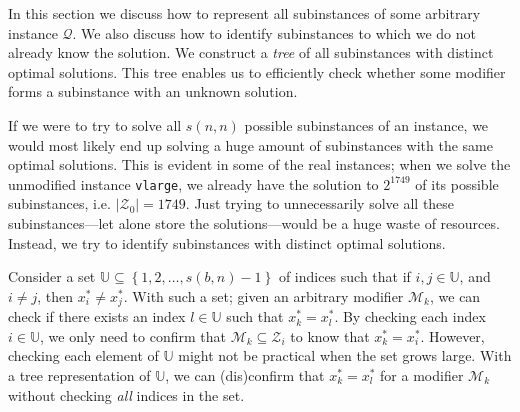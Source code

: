 In this section we discuss how to represent all subinstances of some arbitrary
instance $\mathcal{Q}$. We also discuss how to identify 
subinstances to which we do not already know the solution.
We construct a \emph{tree} of all subinstances with distinct optimal solutions.
This tree enables us to efficiently check whether some modifier forms a
subinstance with an unknown solution.

If we were to try to solve all $s(n, n)$ possible subinstances of an
instance, we would most likely end up solving a huge amount of subinstances
with the same optimal solutions. This is evident in some of the real
instances; when we solve the unmodified instance \texttt{vlarge},
we already have the solution to $2^{1749}$ of its possible subinstances, i.e.
$|\mathcal{Z}_0| = 1749$.
Just trying to unnecessarily solve all these subinstances---let alone store the
solutions---would be a huge waste of resources.
Instead, we try to identify subinstances with distinct optimal solutions.
\begin{comment}
A good starting point is to find all the subsets of $\mathcal{N}_0$ and
use them as modifiers of $Q$. This is equivalent to forcing non-zero
variables in the optimal solution of the unchanged instance $Q$, to zero.
Recall from the previous section that if $\mathcal{Q}$ is known, knowing the
modifier $\mathcal{M}_k$ is sufficient to identify the subinstance
$\mathcal{Q}_k$.
While modifiers $\mathcal{M}_k$ such that
$\mathcal{M}_k \subseteq \mathcal{N}_0$ ensures that $x_k^*\neq x_0^*$,
it does not assure us that $x_k^* \neq x_l^*$ for all $l=1,2,\ldots,s-1$.
To make sure that we only solve subinstances with distinct optimal solutions,
we need to identify modifiers $\mathcal{M}_k$ such that
$\mathcal{M}_k \not \subset \mathcal{Z}_l$
for \emph{all} $l=1,2,\ldots,s-1$.
\end{comment}

Consider a set $\mathbb{U}\subseteq \left\{{1,2,\ldots,s(b, n)-1}\right\}$ of indices
such that if $i,j \in \mathbb{U}$, and $i \neq j$, then $x_i^* \neq x_j^*$.
With such a set; given an arbitrary modifier $\mathcal{M}_k$, we can check
if there exists an index $l \in \mathbb{U}$ such that $x_k^* = x_l^*$. By
checking each index $i \in \mathbb{U}$, we only need to confirm that
$\mathcal{M}_k \subseteq \mathcal{Z}_i$ to know that $x_k^* = x_i^*$. However,
checking each element of $\mathbb{U}$ might not be practical when the set
grows large. With a tree representation of $\mathbb{U}$, we can (dis)confirm
that $x_k^* = x_l^*$ for a modifier $\mathcal{M}_k$ without checking \emph{all}
indices in the set.

